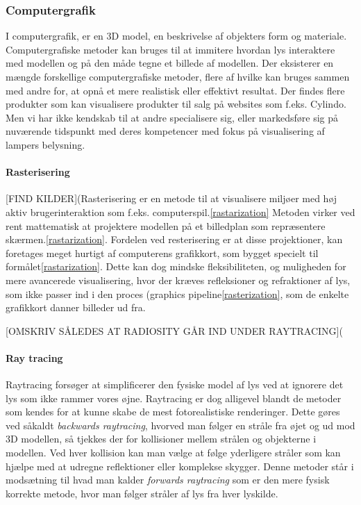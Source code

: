 
\subsubsection{Computergrafik}
I computergrafik, er en 3D model, en beskrivelse af objekters form og materiale.\cite{computergrafik_introduktion} Computergrafiske metoder kan bruges til at immitere hvordan lys interaktere med modellen og på den måde tegne et billede af modellen. Der eksisterer en mængde forskellige computergrafiske metoder, flere af hvilke kan bruges sammen med andre for, at opnå et mere realistisk eller effektivt resultat. Der findes flere produkter som kan visualisere produkter til salg på websites som f.eks. Cylindo\cite{Cylindo}. Men vi har ikke kendskab til at andre specialisere sig, eller markedsføre sig på nuværende tidspunkt med deres kompetencer med fokus på visualisering af lampers belysning.

\paragraph{Rasterisering}
[FIND KILDER](Rasterisering er en metode til at visualisere miljøer med høj aktiv brugerinteraktion som f.eks. computerspil.\ref{rastarization} Metoden virker ved rent mattematisk at projektere modellen på et billedplan som repræsentere skærmen.\ref{rastarization}. Fordelen ved resterisering er at disse projektioner, kan foretages meget hurtigt af computerens grafikkort, som bygget specielt til formålet\ref{rastarization}. Dette kan dog mindske fleksibiliteten, og muligheden for mere avancerede visualisering, hvor der kræves refleksioner og refraktioner af lys, som ikke passer ind i den proces (graphics pipeline\ref{rasterization}, som de enkelte grafikkort danner billeder ud fra. 

[OMSKRIV SÅLEDES AT RADIOSITY GÅR IND UNDER RAYTRACING](\paragraph{Ray tracing \cite{raytracing_for_begyndere}}
Raytracing forsøger at simplificerer den fysiske model af lys ved at ignorere det lys som ikke rammer vores øjne. Raytracing er dog alligevel blandt de metoder som kendes for at kunne skabe de mest fotorealistiske renderinger. Dette gøres ved såkaldt \textit{backwards raytracing}, hvorved man følger en stråle fra øjet og ud mod 3D modellen, så tjekkes der for kollisioner mellem strålen og objekterne i modellen. Ved hver kollision kan man vælge at følge yderligere stråler som kan hjælpe med at udregne reflektioner eller komplekse skygger. Denne metoder står i modsætning til hvad man kalder \textit{forwards raytracing} som er den mere fysisk korrekte metode, hvor man følger stråler af lys fra hver lyskilde.

